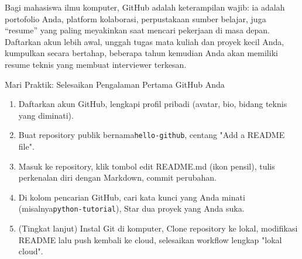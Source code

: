 Bagi mahasiswa ilmu komputer, GitHub adalah keterampilan wajib: ia adalah portofolio Anda, platform kolaborasi, perpustakaan sumber belajar, juga “resume” yang paling meyakinkan saat mencari pekerjaan di masa depan. Daftarkan akun lebih awal, unggah tugas mata kuliah dan proyek kecil Anda, kumpulkan secara bertahap, beberapa tahun kemudian Anda akan memiliki resume teknis yang membuat interviewer terkesan.

\begin{tcbpractice}{Mari Praktik: Selesaikan Pengalaman Pertama GitHub Anda}
\begin{enumerate}
  \item Daftarkan akun GitHub, lengkapi profil pribadi (avatar, bio, bidang teknis yang diminati).
  \item Buat repository publik bernama\texttt{hello-\allowbreak github}, centang "Add a README file".
  \item Masuk ke repository, klik tombol edit README.md (ikon pensil), tulis perkenalan diri dengan Markdown, commit perubahan.
  \item Di kolom pencarian GitHub, cari kata kunci yang Anda minati (misalnya\texttt{python-\allowbreak tutorial}), Star dua proyek yang Anda suka.
  \item (Tingkat lanjut) Instal Git di komputer, Clone repository ke lokal, modifikasi README lalu push kembali ke cloud, selesaikan workflow lengkap "lokal cloud".
\end{enumerate}

\end{tcbpractice}
